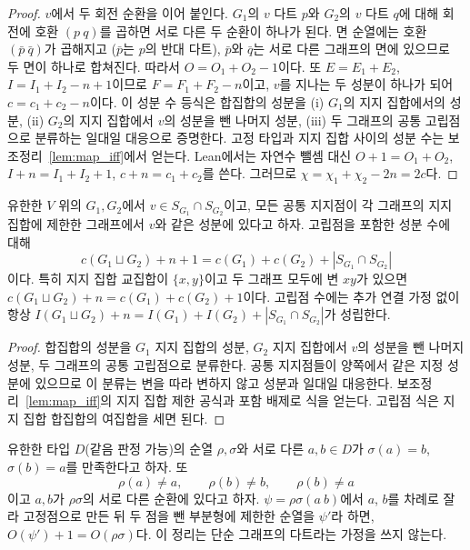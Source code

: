 \begin{proof}
\leanok
\(v\)에서 두 회전 순환을 이어 붙인다. \(G_1\)의 \(v\) 다트 \(p\)와 \(G_2\)의 \(v\) 다트 \(q\)에 대해 회전에
호환 \((p\ q)\)를 곱하면 서로 다른 두 순환이 하나가 된다. 면 순열에는 호환 \((\bar p\ \bar q)\)가 곱해지고
(\(\bar p\)는 \(p\)의 반대 다트), \(\bar p\)와 \(\bar q\)는 서로 다른 그래프의 면에 있으므로 두 면이 하나로
합쳐진다. 따라서 \(O = O_1 + O_2 - 1\)이다. 또 \(E = E_1 + E_2\), \(I = I_1 + I_2 - n + 1\)이므로
\(F = F_1 + F_2 - n\)이고, \(v\)를 지나는 두 성분이 하나가 되어 \(c = c_1 + c_2 - n\)이다.
이 성분 수 등식은 합집합의 성분을 (i) \(G_1\)의 지지 집합에서의 성분, (ii) \(G_2\)의 지지 집합에서
\(v\)의 성분을 뺀 나머지 성분, (iii) 두 그래프의 공통 고립점으로 분류하는 일대일 대응으로 증명한다.
고정 타입과 지지 집합 사이의 성분 수는 보조정리~\ref{lem:map_iff}에서 얻는다. Lean에서는 자연수 뺄셈 대신
\(O + 1 = O_1 + O_2\), \(I + n = I_1 + I_2 + 1\), \(c + n = c_1 + c_2\)를 쓴다. 그러므로
\(\chi = \chi_1 + \chi_2 - 2n = 2c\)다.
\end{proof}

\begin{lemma}
\label{lem:shared_component_counts}
\leanok
유한한 \(V\) 위의 \(G_1,G_2\)에서 \(v\in S_{G_1}\cap S_{G_2}\)이고, 모든 공통 지지점이 각 그래프의
지지 집합에 제한한 그래프에서 \(v\)와 같은 성분에 있다고 하자. 고립점을 포함한 성분 수에 대해
\[
 c(G_1\sqcup G_2)+n+1=c(G_1)+c(G_2)+|S_{G_1}\cap S_{G_2}|
\]
이다. 특히 지지 집합 교집합이 \(\{x,y\}\)이고 두 그래프 모두에 변 \(xy\)가 있으면
\(c(G_1\sqcup G_2)+n=c(G_1)+c(G_2)+1\)이다. 고립점 수에는 추가 연결 가정 없이 항상
\(I(G_1\sqcup G_2)+n=I(G_1)+I(G_2)+|S_{G_1}\cap S_{G_2}|\)가 성립한다.
\end{lemma}

\begin{proof}
\leanok
합집합의 성분을 \(G_1\) 지지 집합의 성분, \(G_2\) 지지 집합에서 \(v\)의 성분을 뺀 나머지 성분,
두 그래프의 공통 고립점으로 분류한다. 공통 지지점들이 양쪽에서 같은 지정 성분에 있으므로 이 분류는
변을 따라 변하지 않고 성분과 일대일 대응한다. 보조정리~\ref{lem:map_iff}의 지지 집합 제한 공식과
포함 배제로 식을 얻는다. 고립점 식은 지지 집합 합집합의 여집합을 세면 된다.
\end{proof}

\begin{lemma}
\label{lem:pair_deletion}
\leanok
유한한 타입 \(D\)(같음 판정 가능)의 순열 \(\rho,\sigma\)와 서로 다른 \(a,b\in D\)가
\(\sigma(a)=b\), \(\sigma(b)=a\)를 만족한다고 하자. 또
\[
 \rho(a)\ne a,\qquad \rho(b)\ne b,\qquad \rho(b)\ne a
\]
이고 \(a,b\)가 \(\rho\sigma\)의 서로 다른 순환에 있다고 하자.
\(\psi=\rho\sigma(a\ b)\)에서 \(a\), \(b\)를 차례로 잘라 고정점으로 만든 뒤 두 점을 뺀 부분형에
제한한 순열을 \(\psi'\)라 하면, \(O(\psi')+1=O(\rho\sigma)\)다.
이 정리는 단순 그래프의 다트라는 가정을 쓰지 않는다.
\end{lemma}

